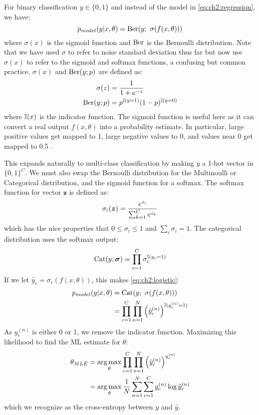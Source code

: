 For binary classification $y \in \{0, 1\}$ and instead of the model in
\eqref{eq:ch2:regression}, we have: 
\begin{equation} \label{eq:ch2:logistic}
  p_{model}(y|x, \theta) = \mathrm{Ber}(y;\ \sigma(f(x, \theta)))
\end{equation}
where $\sigma(x)$ is the sigmoid function and $\mathrm{Ber}$ is the Bernoulli
distribution. Note that we have used $\sigma$ to refer to noise standard
deviation thus far but now use $\sigma(x)$ to refer to the sigmoid and softmax
functions, a confusing but common practice. $\sigma(x)$ and
$\mathrm{Ber}(y; p)$ are defined as:
\begin{align}
  \sigma(z) &= \frac{1}{1+e^{-z}} \label{eq:ch2:sigmoid} \\
  \mathrm{Ber}(y; p) &= p^{\mathbb{I}(y=1)}(1-p)^{\mathbb{I}(y=0)}
\end{align}
where $\mathbb{I}(x)$ is the indicator function. The sigmoid function is useful here
as it can convert a real output $f(x, \theta)$ into a probability estimate.
In particular, large positive values get mapped to 1, large negative values to
0, and values near 0 get mapped to 0.5 \cite[Chapter~6]{goodfellow_deep_2016}.

This expands naturally to multi-class classification by making $y$ a 1-hot
vector in $\{0, 1\}^C$. We must also 
swap the Bernoulli distribution for the Multinoulli or Categorical distribution,
and the sigmoid function for a softmax. The softmax function for vector $\bm{z}$
is defined as:
\begin{equation}
  \sigma_i(\bm{z}) = \frac{e^{z_i}}{\sum_{k=1}^C e^{z_k}} \\
\end{equation}
which has the nice properties that $0 \leq \sigma_i \leq 1$ and $\sum_i \sigma_i = 1$. The categorical
distribution uses the softmax output:
\begin{equation}
  \mathrm{Cat}(y; \bm{\sigma}) = \prod_{c=1}^C \sigma_c^{\mathbb{I}(y_c = 1)}
\end{equation}
If we let $\hat{y}_c = \sigma_c(f(x, \theta))$, this makes \eqref{eq:ch2:logistic}:
\begin{align}\label{eq:ch2:classification}
  p_{model}(y|x, \theta) &= \mathrm{Cat}(y;\ \sigma(f(x, \theta))) \\
                         &= \prod_{c=1}^C \prod_{n=1}^N \left(\hat{y}_c^{(n)}\right)^{\mathbb{I}(y^{(n)}_c = 1)}
\end{align}
As $y^{(n)}_c$ is either 0 or
1, we remove the indicator function. Maximizing this likelihood to
find the ML estimate for $\theta$:
\begin{align}
  \theta_{MLE} &= \operatorname*{arg\,max}_\theta \prod_{c=1}^C \prod_{n=1}^N \left(\hat{y}_c^{(n)}\right)^{y^{(n)}_c} \\
               &= \operatorname*{arg\,max}_\theta \frac{1}{N}\sum_{n=1}^N \sum_{c=1}^C y^{(n)}_c\log \hat{y}_c^{(n)} \label{eq:ch2:mle_class}
\end{align}
which we recognize as the cross-entropy between $y$ and $\hat{y}$.

